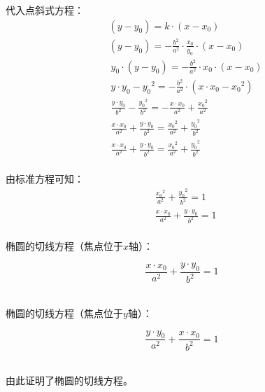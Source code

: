 \documentclass[UTF8]{ctexart}
\begin{document}
    代入点斜式方程：
    \begin{align}
        &(y-y_0)=k\cdot(x-x_0)\\[5mm]
        &(y-y_0)=-\frac{b^2}{a^2}\cdot\frac{x_0}{y_0}\cdot(x-x_0)\\[5mm]
        &~y_0\cdot(y-y_0)=-\frac{b^2}{a^2}\cdot x_0\cdot(x-x_0)\\[5mm]
        &~y\cdot y_0-{y_0}^2=-\frac{b^2}{a^2}\cdot(x\cdot x_0-{x_0}^2)\\[5mm]
        &~\frac{y\cdot y_0}{b^2}-\frac{{y_0}^2}{b^2}=-\frac{x\cdot x_0}{a^2}+\frac{{x_0}^2}{a^2}\\[5mm]
        &~\frac{x\cdot x_0}{a^2}+\frac{y\cdot y_0}{b^2}=\frac{{x_0}^2}{a^2}+\frac{{y_0}^2}{b^2}\\[5mm]
        &~\frac{x\cdot x_0}{a^2}+\frac{y\cdot y_0}{b^2}=\frac{{x_0}^2}{a^2}+\frac{{y_0}^2}{b^2}
    \end{align}\\
    由标准方程可知：
    \begin{align}
        &\frac{{x_0}^2}{a^2}+\frac{{y_0}^2}{b^2}=1\\[5mm]
        &\frac{x\cdot x_0}{a^2}+\frac{y\cdot y_0}{b^2}=1
    \end{align}\\
    椭圆的切线方程（焦点位于$x$轴）：
    \begin{large}
        \begin{equation*}
            \frac{x \cdot x_0}{a^2}+\frac{y \cdot y_0}{b^2}=1
        \end{equation*}
    \end{large}\\
    椭圆的切线方程（焦点位于$y$轴）：
    \begin{large}
        \begin{equation*}
            \frac{y \cdot y_0}{a^2}+\frac{x \cdot x_0}{b^2}=1
        \end{equation*}
    \end{large}\\
    由此证明了椭圆的切线方程。

\newpage
\end{document}
